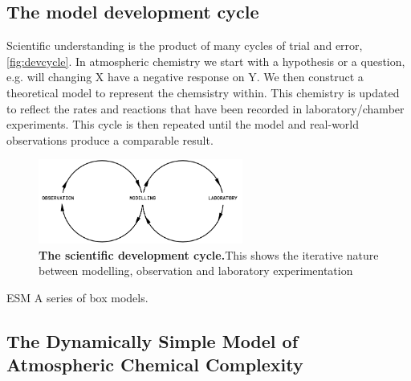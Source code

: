 \subsection{The model development cycle}
Scientific understanding is the product of many cycles of trial and error, \autoref{fig:devcycle}. In atmospheric chemistry we start with a hypothesis or a question, e.g. will changing X have a negative response on Y. We then construct a theoretical model to represent the chemsistry within. This chemistry is updated to reflect the rates and reactions that have been recorded in laboratory/chamber experiments. This cycle is then repeated until the model and real-world observations produce a comparable result.
\begin{figure}[H]
    \centering
    \includegraphics[width=0.6\textwidth]{devcycle.png}
    \caption{\textbf{The scientific development cycle.}This shows the iterative nature between modelling, observation and laboratory experimentation}
    \label{fig:devcycle}
\end{figure}

ESM
 A series of box models.
 \subsection{The Dynamically Simple Model of Atmospheric Chemical Complexity}


